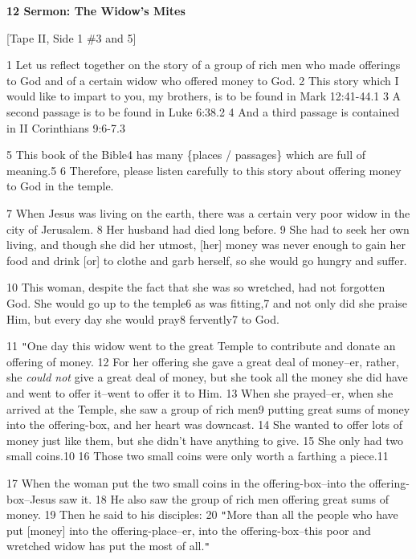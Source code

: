 
\textbf{12 Sermon: The Widow's Mites}

[Tape II, Side 1 \#3 and 5]

1 Let us reflect together on the story of a group of rich men who made offerings
to God and of a certain widow who offered money to God. 2 This story which I would
like to impart to you, my brothers, is to be found in Mark 12:41-44.1 3 A second
passage is to be found in Luke 6:38.2 4 And a third passage is contained in II
Corinthians 9:6-7.3

5 This book of the Bible4 has many \{places / passages\} which are full of meaning.5
6 Therefore, please listen carefully to this story about offering money to God
in the temple.

7 When Jesus was living on the earth, there was a certain very poor widow in the
city of Jerusalem. 8 Her husband had died long before. 9 She had to seek her own
living, and though she did her utmost, [her] money was never enough to gain her
food and drink [or] to clothe and garb herself, so she would go hungry and suffer.

10 This woman, despite the fact that she was so wretched, had not forgotten God.
She would go up to the temple6 as was fitting,7 and not only did she praise Him,
but every day she would pray8 fervently7 to God.

11 \texttt{"}One day this widow went to the great Temple to contribute and donate
an offering of money. 12 For her offering she gave a great deal of money--er, rather,
she \textit{could not} give a great deal of money, but she took all the money she
did have and went to offer it--went to offer it to Him. 13 When she prayed--er,
when she arrived at the Temple, she saw a group of rich men9 putting great sums
of money into the offering-box, and her heart was downcast. 14 She wanted to offer
lots of money just like them, but she didn't have anything to give. 15 She only
had two small coins.10 16 Those two small coins were only worth a farthing a piece.11

17 When the woman put the two small coins in the offering-box--into the offering-box--Jesus
saw it. 18 He also saw the group of rich men offering great sums of money. 19 Then
he said to his disciples: 20 \texttt{"}More than all the people who have put [money]
into the offering-place--er, into the offering-box--this poor and wretched widow
has put the most of all.\texttt{"}

